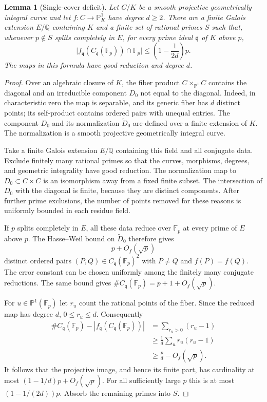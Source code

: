 \documentclass[11pt,a4paper]{article}
\newtheorem{lemma}[theorem]{Lemma}
\theoremstyle{definition}
\theoremstyle{remark}
\newcommand{\Q}{\mathbb Q}
\newcommand{\F}{\mathbb F}
\newcommand{\Pone}{\mathbb P^1}
\begin{document}
\begin{lemma}[Single-cover deficit]\label{lem:localgap}
Let $C/K$ be a smooth projective geometrically integral curve and let
$f:C\to\Pone_K$ have degree $d\ge2$. There are a finite Galois extension
$E/\Q$ containing $K$ and a finite set of rational primes $S$ such that,
whenever $p\notin S$ splits completely in $E$, for every prime ideal
$\mathfrak q$ of $K$ above $p$,
\begin{equation}\label{eq:localgap}
 \bigl|f_{\mathfrak q}(C_{\mathfrak q}(\F_p))\cap\F_p\bigr|
 \le\left(1-\frac1{2d}\right)p.
\end{equation}
The maps in this formula have good reduction and degree $d$.
\end{lemma}
\begin{proof}
Over an algebraic closure of $K$, the fiber product
$C\times_{\Pone}C$ contains the diagonal and an irreducible component
$D_0$ not equal to the diagonal. Indeed, in characteristic zero the
map is separable, and its generic fiber has $d$ distinct points; its
self-product contains ordered pairs with unequal entries. The
component $D_0$ and its normalization $\widetilde D_0$ are defined over
a finite extension of $K$. The normalization is a smooth projective
geometrically integral curve.

Take a finite Galois extension $E/\Q$ containing this field and all
conjugate data. Exclude finitely many rational primes so that the curves,
morphisms, degrees, and geometric integrality have good reduction.
The normalization map to $D_0\subset C\times C$ is an isomorphism away
from a fixed finite subset. The intersection of $D_0$ with the diagonal
is finite, because they are distinct components. After further prime
exclusions, the number of points removed for these reasons is uniformly
bounded in each residue field.

If $p$ splits completely in $E$, all these data reduce over $\F_p$ at
every prime of $E$ above $p$. The Hasse--Weil bound on
$\widetilde D_0$ therefore gives
\[
 p+O_f(\sqrt p)
\]
distinct ordered pairs $(P,Q)\in C_{\mathfrak q}(\F_p)^2$ with
$P\ne Q$ and $f(P)=f(Q)$. The error constant can be chosen uniformly
among the finitely many conjugate reductions. The same bound gives
$\#C_{\mathfrak q}(\F_p)=p+1+O_f(\sqrt p)$.

For $u\in\Pone(\F_p)$ let $r_u$ count the rational points of the fiber.
Since the reduced map has degree $d$, $0\le r_u\le d$. Consequently
\begin{align*}
 \#C_{\mathfrak q}(\F_p)-|f_{\mathfrak q}(C_{\mathfrak q}(\F_p))|
 &=\sum_{r_u>0}(r_u-1)\\
 &\ge\frac1d\sum_u r_u(r_u-1)\\
 &\ge\frac pd-O_f(\sqrt p).
\end{align*}
It follows that the projective image, and hence its finite part, has
cardinality at most $(1-1/d)p+O_f(\sqrt p)$. For all sufficiently large
$p$ this is at most $(1-1/(2d))p$. Absorb the remaining primes into $S$.
\end{proof}
\end{document}
